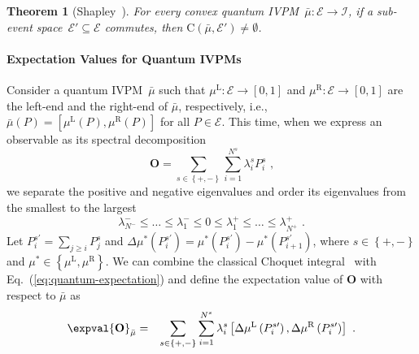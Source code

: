 \documentclass[english,reprint, aps, prl,superscriptaddress, showpacs,
showkeys, longbibliography, amsmath, amssymb]{revtex4-1}
\theoremstyle{plain}
\newtheorem{thm}{Theorem}
\theoremstyle{definition}
\newcommand{\events}{\ensuremath{\mathcal{E}}}
\newcommand{\coreBorn}{\ensuremath{\mathrm{C}}}
\newcommand{\mul}[1][]{\ensuremath{\mu^{\mathrm{L{#1}}}}}
\newcommand{\mur}[1][]{\ensuremath{\mu^{\mathrm{R{#1}}}}}
\begin{document}
\begin{thm}[Shapley~\cite{Shapley1971,Grabisch2016}\label{thm:Shapley}]
For every convex quantum IVPM~$\bar{\mu}:\events\rightarrow\mathscr{I}$,
if a sub-event space~$\events'\subseteq\events$ commutes, then $\coreBorn\left(\bar{\mu},\events'\right)\ne\emptyset$.
\end{thm}

\paragraph{Expectation Values for Quantum IVPMs}

Consider a quantum IVPM~$\bar{\mu}$ such that $\mul:\events\rightarrow\left[0,1\right]$
and $\mur:\events\rightarrow\left[0,1\right]$ are the left-end and
the right-end of $\bar{\mu}$, respectively, i.e., $\bar{\mu}\left(P\right)=\left[\mul\left(P\right),\mur\left(P\right)\right]$
for all $P\in\events$. This time, when we express an observable as
its spectral decomposition
\begin{equation}
\mathbf{O}=\sum_{s\in\left\{ +,-\right\} }\sum_{i=1}^{N^{s}}\lambda_{i}^{s}P_{i}^{s}\textrm{ ,}\label{eq:spectrum-decomposition}
\end{equation}
we separate the positive and negative eigenvalues and order its eigenvalues
from the smallest to the largest 
\begin{equation}
\lambda_{N^{-}}^{-}\le\ldots\le\lambda_{1}^{-}\le0\le\lambda_{1}^{+}\le\ldots\le\lambda_{N^{+}}^{+}\textrm{ .}
\end{equation}
Let $P_{i}^{s\prime}=\sum_{j\ge i}P_{j}^{s}$ and $\Delta\mu^{*}\left(P_{i}^{s\prime}\right)=\mu^{*}\left(P_{i}^{s\prime}\right)-\mu^{*}\left(P_{i+1}^{s\prime}\right)$,
where $s\in\left\{ +,-\right\} $ and $\mu^{*}\in\left\{ \mul,\mur\right\} $.
We can combine the classical Choquet integral~\cite{Vitali1925,Choquet1954,GilboaSchmeidler1994,Grabisch2016}
with Eq.~(\ref{eq:quantum-expectation}) and define the expectation
value of $\mathbf{O}$ with respect to $\bar{\mu}$ as
\begin{eqnarray}
\expval{\mathbf{O}}_{\bar{\mu}} & = & \sum_{s\in\left\{ +,-\right\} }\sum_{i=1}^{N^{s}}\lambda_{i}^{s}\left[\Delta\mul\left(P_{i}^{s\prime}\right),\Delta\mur\left(P_{i}^{s\prime}\right)\right]\textrm{ .}\label{eq:quantum-interval-expectation}
\end{eqnarray}
\end{document}
